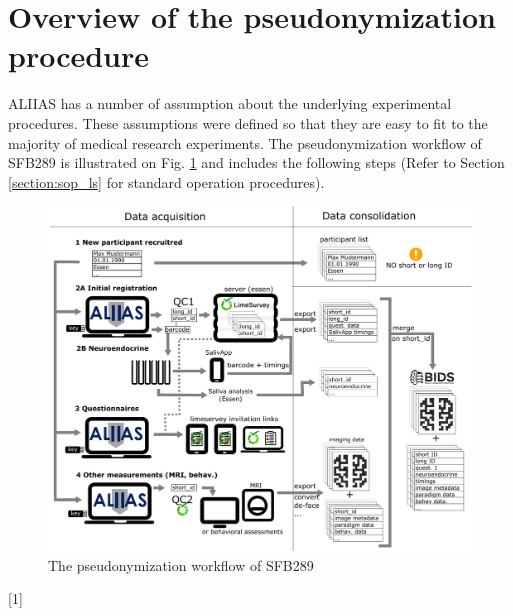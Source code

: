 \section{Overview of the pseudonymization procedure}
\label{section:overview}
ALIIAS has a number of assumption about the underlying experimental procedures. These assumptions were defined so that they are easy to fit to the majority of medical research experiments. The pseudonymization workflow of SFB289 is illustrated on Fig. \ref{fig:flowchart} and includes the following steps (Refer to Section \ref{section:sop_ls} for standard operation procedures).

\begin{figure}[H]
\centering
\includegraphics[width=1.0\textwidth]{docs/fig/overview_v3.eps}
\caption{The pseudonymization workflow of SFB289}
\label{fig:flowchart}
\end{figure}

[1]

